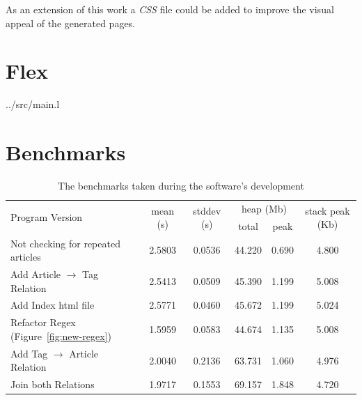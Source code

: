 \documentclass[a4paper]{report}
\begin{document}
As an extension of this work a \textit{CSS} file could be added to
improve the visual appeal of the generated pages.

\appendix

\chapter{Flex}


{../src/main.l}

\chapter{Benchmarks}\label{app:benches}
\begin{table}[h]
    \begin{tabular}{l c c c c c}
        \multirow{2}{*}{Program Version} & \multirow{2}{*}{mean (s)} &
        \multirow{2}{*}{stddev (s)} & \multicolumn{2}{c}{heap (Mb)} &
        \multirow{2}{*}{stack peak (Kb)}\\

        &    &    & total & peak & \\\toprule

        Not checking for repeated articles
        &2.5803&0.0536&44.220  &0.690  &4.800\\

        Add Article $\to$ Tag Relation
        &2.5413&0.0509&45.390  &1.199  &5.008\\

        Add Index html file
        &2.5771&0.0460&45.672  &1.199  &5.024\\

        Refactor Regex (Figure~\ref{fig:new-regex})
        &1.5959&0.0583&44.674  &1.135  &5.008\\

        Add Tag $\to$ Article Relation
        &2.0040&0.2136&63.731  &1.060  &4.976\\

        Join both Relations
        &1.9717&0.1553&69.157  &1.848  &4.720\\\bottomrule

    \end{tabular}
    \caption{The benchmarks taken during the software's development}
\end{table}
\end{document}
